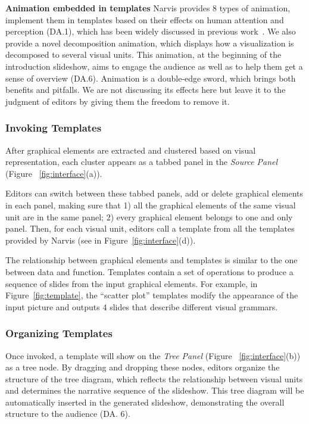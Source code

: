 \noindent
\textbf{Animation embedded in templates }
Narvis provides 8 types of animation, implement them in templates based on their effects on human attention and perception (DA.1), which has been widely discussed in previous work~\cite{robertson_effectiveness_2008, waldner_attractive_2014, heer_animated_2007}. We also provide a novel decomposition animation, which displays how a visualization is decomposed to several visual units. This animation, at the beginning of the introduction slideshow, aims to engage the audience as well as to help them get a sense of overview (DA.6).
Animation is a double-edge sword, which brings both benefits and pitfalls. We are not discussing its effects here but leave it to the judgment of editors by giving them the freedom to remove it.


\subsubsection{Invoking Templates} 

After graphical elements are extracted and clustered based on visual representation, each cluster appears as a tabbed panel in the \textit{Source Panel} (Figure ~\ref{fig:interface}(a)). 

Editors can switch between these tabbed panels, add or delete graphical elements in each panel, making sure that 1) all the graphical elements of the same visual unit are in the same panel; 2) every graphical element belongs to one and only panel. Then, for each visual unit, editors call a template from all the templates provided by Narvis (see in Figure~\ref{fig:interface}(d)). 

The relationship between graphical elements and templates is similar to the one between data and function. Templates contain a set of operations to produce a sequence of slides from the input graphical elements. For example, in Figure~\ref{fig:template}, the ``scatter plot'' templates modify the appearance of the input picture and outputs 4 slides that describe different visual grammars. 

\subsubsection{Organizing Templates} 
Once invoked, a template will show on the \textit{Tree Panel} (Figure ~\ref{fig:interface}(b)) as a tree node. 
By dragging and dropping these nodes, editors organize the structure of the tree diagram, which reflects the relationship between visual units and determines the narrative sequence of the slideshow. This tree diagram will be automatically inserted in the generated slideshow, demonstrating the overall structure to the audience (DA. 6). 


